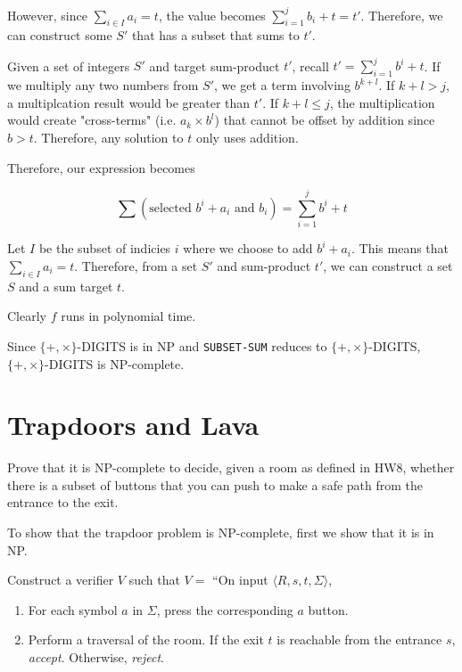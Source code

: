 \documentclass{article}
\begin{document}
        However, since $\sum_{i \in I} a_i = t$, the value becomes $\sum_{i=1}^j b_i + t = t'$. Therefore, we can construct some $S'$ that has a subset that sums to $t'$. 

        Given a set of integers $S'$ and target sum-product $t'$, recall $t' = \sum_{i = 1}^j b^i + t$. If we multiply any two numbers from $S'$, we get a term involving $b^{k + l}$. If $k + l > j$, a multiplcation result would be greater than $t'$. If $k + l \le j$, the multiplication would create "cross-terms" (i.e. $a_k \times b^l$) that cannot be offset by addition since $b > t$. Therefore, any solution to $t$ only uses addition. 

        Therefore, our expression becomes 

        \begin{equation*}
            \sum (\text{selected $b^i + a_i$ and $b_i$}) = \sum_{i=1}^j b^i + t
        \end{equation*}

        Let $I$ be the subset of indicies $i$ where we choose to add $b^i + a_i$. This means that $\sum_{i \in I} a_i = t$. Therefore, from a set $S'$ and sum-product $t'$, we can construct a set $S$ and a sum target $t$. 

        Clearly $f$ runs in polynomial time.

        Since $\{+, \times\}$-DIGITS is in NP and \texttt{SUBSET-SUM} reduces to $\{+, \times\}$-DIGITS, $\{+, \times\}$-DIGITS is NP-complete.
         

    \section{Trapdoors and Lava}

        Prove that it is NP-complete to decide, given a room as defined in HW8, whether there is a subset of buttons that you can push to make a safe path from the entrance to the exit.

        To show that the trapdoor problem is NP-complete, first we show that it is in NP.

        Construct a verifier $V$ such that $V = $ ``On input $\langle R, s, t, \Sigma \rangle$, 
        \begin{enumerate}[1.]
            \item For each symbol $a$ in $\Sigma$, press the corresponding $a$ button. 

            \item Perform a traversal of the room. If the exit $t$ is reachable from the entrance $s$, \textit{accept}. Otherwise, \textit{reject}.
        \end{enumerate}
\end{document}
